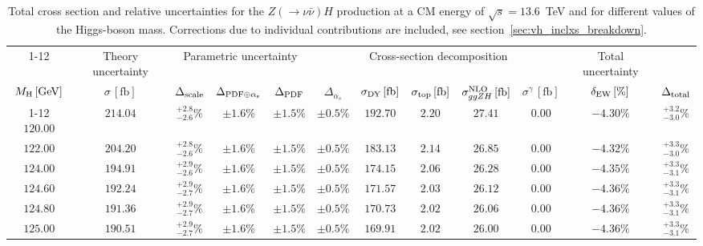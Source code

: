 \begin{landscape}
\begin{table}[ht!]
\caption{Total cross section and relative uncertainties for the $Z ( \rightarrow 
\nu \bar{\nu}) H$ production at a CM energy of  $\sqrt{s}=13.6$~TeV and for different values of the Higgs-boson mass. Corrections due to individual contributions are included, see section~\ref{sec:vh_inclxs_breakdown}.}
\label{tab:zh_nu_xs_13.6tev}
\centering
\scriptsize
{\renewcommand{\arraystretch}{1.4}
\begin{tabular}{| cc | c | ccc | ccccc | c |}
\cline{1-12}
\multicolumn{2}{|c|}{\(\sqrt{s} = 13.6\,\mathrm{TeV}\)} &
\multicolumn{1}{|c|}{Theory uncertainty} &
\multicolumn{3}{|c|}{Parametric uncertainty} &
\multicolumn{5}{|c|}{Cross-section decomposition} &
\multicolumn{1}{c|}{Total uncertainty} \\
\(M_\mathrm{H}\,[\mathrm{GeV}]\) & \(\sigma\,[\mathrm{fb}]\) &
\(\Delta_{\rm scale}\) &
\(\Delta_{\rm PDF\oplus\alpha_s}\) &
{\color{black!55}\(\Delta_{\rm PDF}\)} & {\color{black!55}\(\Delta_{\alpha_s}\)} &
\(\sigma_{\rm DY}\,[\mathrm{fb}]\) & \(\sigma_{\rm top}\,[\mathrm{fb}]\) & \(\sigma^{\rm NLO}_{ggZH}\,[\mathrm{fb}]\) & \(\sigma^\gamma\,[\mathrm{fb}]\) & \(\delta_{\rm EW}\,[\%]\) &
\(\Delta_{\rm total}\)
\\
\cline{1-12}
$120.00$ & $214.04$ & $^{+2.8}_{-2.6}\%$ & $\pm 1.6\%$ & {\color{black!55}$\pm 1.5\%$} & {\color{black!55}$\pm 0.5\%$} & $192.70$ & $2.20$ & $27.41$ & $0.00$ & $-4.30\%$ & $^{+3.2}_{-3.0}\%$ \\
$122.00$ & $204.20$ & $^{+2.8}_{-2.6}\%$ & $\pm 1.6\%$ & {\color{black!55}$\pm 1.5\%$} & {\color{black!55}$\pm 0.5\%$} & $183.13$ & $2.14$ & $26.85$ & $0.00$ & $-4.32\%$ & $^{+3.3}_{-3.0}\%$ \\
$124.00$ & $194.91$ & $^{+2.9}_{-2.6}\%$ & $\pm 1.6\%$ & {\color{black!55}$\pm 1.5\%$} & {\color{black!55}$\pm 0.5\%$} & $174.15$ & $2.06$ & $26.28$ & $0.00$ & $-4.35\%$ & $^{+3.3}_{-3.1}\%$ \\
$124.60$ & $192.24$ & $^{+2.9}_{-2.7}\%$ & $\pm 1.6\%$ & {\color{black!55}$\pm 1.5\%$} & {\color{black!55}$\pm 0.5\%$} & $171.57$ & $2.03$ & $26.12$ & $0.00$ & $-4.36\%$ & $^{+3.3}_{-3.1}\%$ \\
$124.80$ & $191.36$ & $^{+2.9}_{-2.7}\%$ & $\pm 1.6\%$ & {\color{black!55}$\pm 1.5\%$} & {\color{black!55}$\pm 0.5\%$} & $170.73$ & $2.02$ & $26.06$ & $0.00$ & $-4.36\%$ & $^{+3.3}_{-3.1}\%$ \\
$125.00$ & $190.51$ & $^{+2.9}_{-2.7}\%$ & $\pm 1.6\%$ & {\color{black!55}$\pm 1.5\%$} & {\color{black!55}$\pm 0.5\%$} & $169.91$ & $2.02$ & $26.00$ & $0.00$ & $-4.36\%$ & $^{+3.3}_{-3.1}\%$ \\

\end{tabular}}
\end{table}
\end{landscape}
